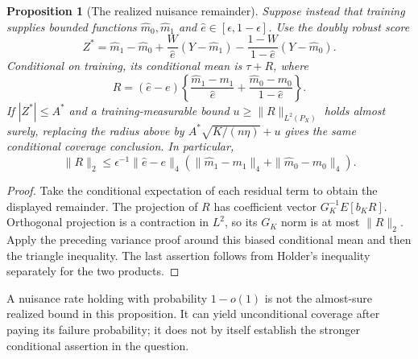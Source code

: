 \documentclass[11pt]{article}
\newtheorem{proposition}[theorem]{Proposition}
\theoremstyle{remark}
\begin{document}
\begin{proposition}[The realized nuisance remainder]
Suppose instead that training supplies bounded functions $\widehat m_0,\widehat m_1$ and $\widehat e\in[\epsilon,1-\epsilon]$. Use the doubly robust score
\[
 Z^*=\widehat m_1-\widehat m_0+
 \frac W{\widehat e}(Y-\widehat m_1)
 -\frac{1-W}{1-\widehat e}(Y-\widehat m_0).
\]
Conditional on training, its conditional mean is $\tau+R$, where
\[
 R=(\widehat e-e)\left\{
 \frac{\widehat m_1-m_1}{\widehat e}
 +\frac{\widehat m_0-m_0}{1-\widehat e}\right\}.
\]
If $|Z^*|\le A^*$ and a training-measurable bound $u\ge\|R\|_{L^2(P_X)}$ holds almost surely, replacing the radius above by
$A^*\sqrt{K/(n\eta)}+u$ gives the same conditional coverage conclusion. In particular,
\[
 \|R\|_2\le\epsilon^{-1}\|\widehat e-e\|_4
 (\|\widehat m_1-m_1\|_4+\|\widehat m_0-m_0\|_4).
\]
\end{proposition}
\begin{proof}
Take the conditional expectation of each residual term to obtain the displayed remainder. The projection of $R$ has coefficient vector $G_K^{-1}E[b_KR]$. Orthogonal projection is a contraction in $L^2$, so its $G_K$ norm is at most $\|R\|_2$. Apply the preceding variance proof around this biased conditional mean and then the triangle inequality. The last assertion follows from Holder's inequality separately for the two products.
\end{proof}
A nuisance rate holding with probability $1-o(1)$ is not the almost-sure realized bound in this proposition. It can yield unconditional coverage after paying its failure probability; it does not by itself establish the stronger conditional assertion in the question.
\end{document}
